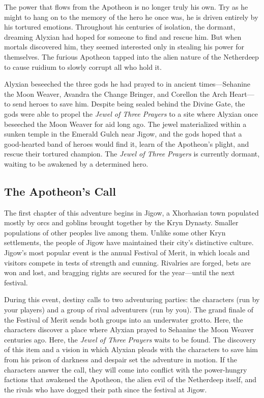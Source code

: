 \documentclass[10pt,a4paper,twoside,fancy,bg=print,twocolumn,openany,nodeprecatedcode]{dndbook}
\begin{document}
The power that flows from the Apotheon is no longer truly his own. Try as he might to hang on to the memory of the hero he once was, he is driven entirely by his tortured emotions. Throughout his centuries of isolation, the dormant, dreaming Alyxian had hoped for someone to find and rescue him. But when mortals discovered him, they seemed interested only in stealing his power for themselves. The furious Apotheon tapped into the alien nature of the Netherdeep to cause ruidium to slowly corrupt all who hold it.

Alyxian beseeched the three gods he had prayed to in ancient times—Sehanine the Moon Weaver, Avandra the Change Bringer, and Corellon the Arch Heart—to send heroes to save him. Despite being sealed behind the Divine Gate, the gods were able to propel the \textit{Jewel of Three Prayers} to a site where Alyxian once beseeched the Moon Weaver for aid long ago. The jewel materialized within a sunken temple in the Emerald Gulch near Jigow, and the gods hoped that a good-hearted band of heroes would find it, learn of the Apotheon's plight, and rescue their tortured champion. The \textit{Jewel of Three Prayers} is currently dormant, waiting to be awakened by a determined hero.

\subsection{The Apotheon's Call}
The first chapter of this adventure begins in Jigow, a Xhorhasian town populated mostly by orcs and goblins brought together by the Kryn Dynasty. Smaller populations of other peoples live among them. Unlike some other Kryn settlements, the people of Jigow have maintained their city's distinctive culture. Jigow's most popular event is the annual Festival of Merit, in which locals and visitors compete in tests of strength and cunning. Rivalries are forged, bets are won and lost, and bragging rights are secured for the year—until the next festival.

During this event, destiny calls to two adventuring parties: the characters (run by your players) and a group of rival adventurers (run by you). The grand finale of the Festival of Merit sends both groups into an underwater grotto. Here, the characters discover a place where Alyxian prayed to Sehanine the Moon Weaver centuries ago. Here, the \textit{Jewel of Three Prayers} waits to be found. The discovery of this item and a vision in which Alyxian pleads with the characters to save him from his prison of darkness and despair set the adventure in motion. If the characters answer the call, they will come into conflict with the power-hungry factions that awakened the Apotheon, the alien evil of the Netherdeep itself, and the rivals who have dogged their path since the festival at Jigow.
\end{document}
